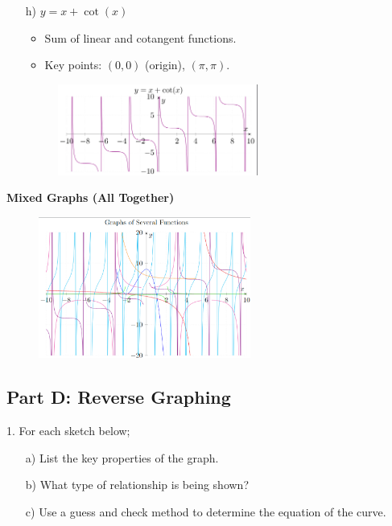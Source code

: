 \documentclass{article}
\newenvironment{solution}{\color{solutioncolor}}{}
\begin{document}
\begin{enumerate}
    \item[h)] \( y = x + \cot(x) \)
    \begin{solution}
       \begin{itemize}
           \item Sum of linear and cotangent functions.
           \item Key points: \((0, 0)\) (origin), \((\pi, \pi)\).
       \end{itemize}
\begin{figure}[h]
    \centering
    \includegraphics[width=0.62\textwidth]{imgs/imgs FSE/y=x+cotx.png}
    \label{fig:image}
\end{figure}       
    \end{solution}   
\end{enumerate}

\textbf{Mixed Graphs (All Together)}
\begin{figure}[h]
    \centering
    \includegraphics[width=0.62\textwidth]{imgs/imgs FSE/Graph_of_Several_Functions.png}
    \label{fig:image}
\end{figure}   

\newpage

\subsection*{Part D: Reverse Graphing}
1. For each sketch below;
\begin{enumerate}
    \item[a)] List the key properties of the graph.
    \item[b)] What type of relationship is being shown?
    \item[c)] Use a guess and check method to determine the equation of the curve. 
\end{enumerate}
\end{document}
